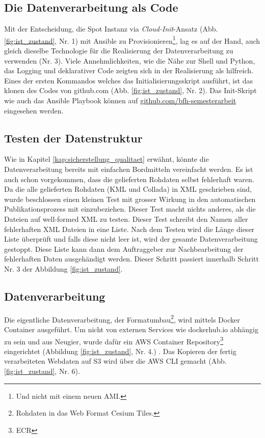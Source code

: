 \subsection{Die Datenverarbeitung als Code}
Mit der Entscheidung, die Spot Instanz via \emph{Cloud-Init}-Ansatz (Abb. \ref{fig:ist_zustand}, Nr. 1) mit Ansible zu Provisionieren\footnote{Und nicht mit einem neuen AMI.}, lag es auf der Hand, auch gleich dieselbe Technologie für die Realisierung der Datenverarbeitung zu verwenden (Nr. 3). 
Viele Annehmlichkeiten, wie die Nähe zur Shell und Python, das Logging und deklarativer Code zeigten sich in der Realisierung als hilfreich. Eines der ersten Kommandos welches das Initialisierungsskript ausführt, ist das klonen des Codes von github.com (Abb. \ref{fig:ist_zustand}, Nr. 2). Das Init-Skript wie auch das Ansible Playbook können auf \href{https://github.com/bfh-semesterarbeit/up-and-running-dataprocessing}{github.com/bfh-semesterarbeit} eingesehen werden.


\subsection{Testen der Datenstruktur}
Wie in Kapitel \ref{kap:sicherstellung_qualitaet} erwähnt, könnte die Datenverarbeitung bereits mit einfachen Bordmitteln vereinfacht werden. Es ist auch schon vorgekommen, dass die gelieferten Rohdaten selbst fehlerhaft waren. Da die alle gelieferten Rohdaten (KML und Collada) in XML geschrieben sind, wurde beschlossen einen kleinen Test mit grosser Wirkung in den automatischen Publikationsprozess mit einzubeziehen. Dieser Test macht nichts anderes, als die Dateien auf well-formed XML zu testen. 
Dieser Test schreibt den Namen aller fehlerhaften XML Dateien in eine Liste. Nach dem Testen wird die Länge dieser Liste überprüft und falls diese nicht leer ist, wird der gesamte Datenverarbeitung gestoppt. Diese Liste kann dann dem Auftraggeber zur Nachbearbeitung der fehlerhaften Daten ausgehändigt werden. Dieser Schritt passiert innerhalb Schritt Nr. 3 der  Abbildung \ref{fig:ist_zustand}.

\subsection{Datenverarbeitung}
Die eigentliche Datenverarbeitung, der Formatumbau\footnote{Rohdaten in das Web Format Cesium Tiles.}, wird mittels Docker Container ausgeführt. Um nicht von externen Services wie dockerhub.io abhängig zu sein und aus Neugier, wurde dafür ein AWS Container Repository\footnote{ECR} eingerichtet (Abbildung \ref{fig:ist_zustand}, Nr. 4.) \cite{9781484251003}. Das Kopieren der fertig verarbeiteten Webdaten auf S3 wird über die AWS CLI gemacht (Abb. \ref{fig:ist_zustand}, Nr. 6).

